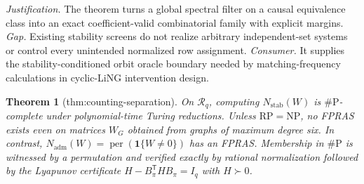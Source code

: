 \documentclass{article}
\newtheorem{theorem}{Theorem}
\begin{document}
\par\smallskip\noindent \textit{Justification.} The theorem turns a global spectral filter on a causal equivalence class into an exact coefficient-valid combinatorial family with explicit margins. \textit{Gap.} Existing stability screens do not realize arbitrary independent-set systems or control every unintended normalized row assignment. \textit{Consumer.} It supplies the stability-conditioned orbit oracle boundary needed by matching-frequency calculations in cyclic-LiNG intervention design.

\begin{theorem}[thm:counting-separation]\label{thm:counting-separation}
On \(\mathcal R_q\), computing \(N_{\mathrm{stab}}(W)\) is \(\#\mathrm P\)-complete under polynomial-time Turing reductions. Unless \(\mathrm{RP}=\mathrm{NP}\), no FPRAS exists even on matrices \(W_G\) obtained from graphs of maximum degree six. In contrast, \(N_{\mathrm{adm}}(W)=\operatorname{per}(\mathbf 1\{W\neq0\})\) has an FPRAS. Membership in \(\#\mathrm P\) is witnessed by a permutation and verified exactly by rational normalization followed by the Lyapunov certificate \(H-B_\pi^{\mathsf T}HB_\pi=I_q\) with \(H\succ0\).
\end{theorem}
\end{document}

